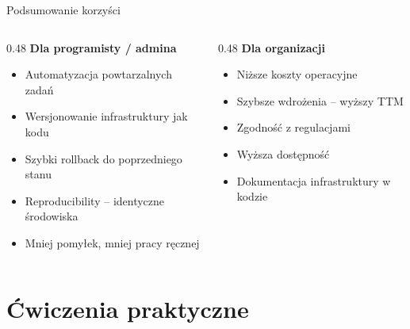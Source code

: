 \documentclass{beamer}
\begin{document}
\begin{frame}{Podsumowanie korzy\'sci}
    \begin{columns}[T]
        \begin{column}{0.48\textwidth}
            \textbf{Dla programisty / admina}
            \begin{itemize}
                \item Automatyzacja powtarzalnych zada\'n
                \item Wersjonowanie infrastruktury jak kodu
                \item Szybki rollback do poprzedniego stanu
                \item Reproducibility -- identyczne \'srodowiska
                \item Mniej pomy\l{}ek, mniej pracy r\k{e}cznej
            \end{itemize}
        \end{column}
        \begin{column}{0.48\textwidth}
            \textbf{Dla organizacji}
            \begin{itemize}
                \item Ni\.zsze koszty operacyjne
                \item Szybsze wdro\.zenia -- wy\.zszy TTM
                \item Zgodno\'s\'c z regulacjami
                \item Wy\.zsza dost\k{e}pno\'s\'c
                \item Dokumentacja infrastruktury w kodzie
            \end{itemize}
        \end{column}
    \end{columns}
    \vspace{0.8em}
\end{frame}

\section{\'{C}wiczenia praktyczne}
\end{document}
